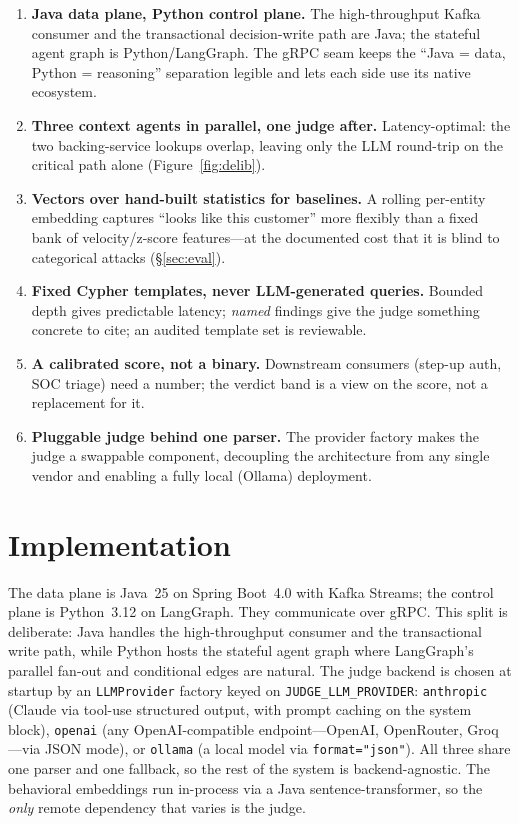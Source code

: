 \documentclass[sigconf,nonacm,screen]{acmart}
\newcommand{\us}{\_\allowbreak}   %
\begin{document}
\begin{enumerate}
  \item \textbf{Java data plane, Python control plane.} The high-throughput
        Kafka consumer and the transactional decision-write path are Java; the
        stateful agent graph is Python/LangGraph. The gRPC seam keeps the
        ``Java = data, Python = reasoning'' separation legible and lets each side
        use its native ecosystem.
  \item \textbf{Three context agents in parallel, one judge after.}
        Latency-optimal: the two backing-service lookups overlap, leaving only
        the LLM round-trip on the critical path alone (Figure~\ref{fig:delib}).
  \item \textbf{Vectors over hand-built statistics for baselines.} A rolling
        per-entity embedding captures ``looks like this customer'' more flexibly
        than a fixed bank of velocity/z-score features---at the documented cost
        that it is blind to categorical attacks (\S\ref{sec:eval}).
  \item \textbf{Fixed Cypher templates, never LLM-generated queries.} Bounded
        depth gives predictable latency; \emph{named} findings give the judge
        something concrete to cite; an audited template set is reviewable.
  \item \textbf{A calibrated score, not a binary.} Downstream consumers
        (step-up auth, SOC triage) need a number; the verdict band is a view on
        the score, not a replacement for it.
  \item \textbf{Pluggable judge behind one parser.} The provider factory makes
        the judge a swappable component, decoupling the architecture from any
        single vendor and enabling a fully local (Ollama) deployment.
\end{enumerate}

\section{Implementation}

The data plane is Java~25 on Spring Boot~4.0 with Kafka Streams; the control
plane is Python~3.12 on LangGraph. They communicate over gRPC. This split is
deliberate: Java handles the high-throughput consumer and the transactional
write path, while Python hosts the stateful agent graph where LangGraph's
parallel fan-out and conditional edges are natural. The judge backend is chosen
at startup by an \texttt{LLMProvider} factory keyed on
\texttt{JUDGE\us LLM\us PROVIDER}: \texttt{anthropic} (Claude via tool-use structured
output, with prompt caching on the system block), \texttt{openai} (any
OpenAI-compatible endpoint---OpenAI, OpenRouter, Groq---via JSON mode), or
\texttt{ollama} (a local model via \texttt{format="json"}). All three share one
parser and one fallback, so the rest of the system is backend-agnostic. The
behavioral embeddings run in-process via a Java sentence-transformer, so the
\emph{only} remote dependency that varies is the judge.
\end{document}
